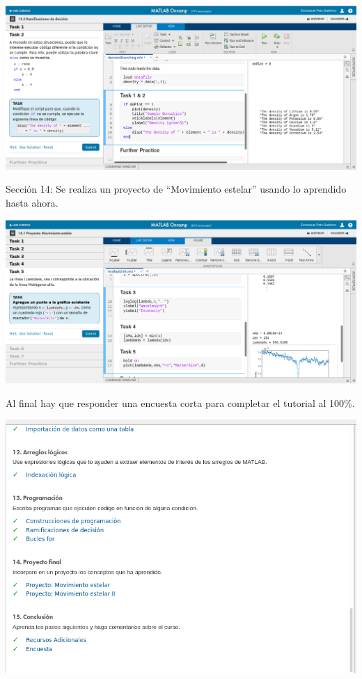 \documentclass{article}
\begin{document}
\includegraphics[width=\linewidth]{imagenes/13}

Sección 14: Se realiza un proyecto de ``Movimiento estelar'' usando lo aprendido hasta ahora.

\includegraphics[width=\linewidth]{imagenes/14}

Al final hay que responder una encuesta corta para completar el tutorial al 100\%.

\includegraphics[width=\linewidth]{imagenes/15}
\end{document}
